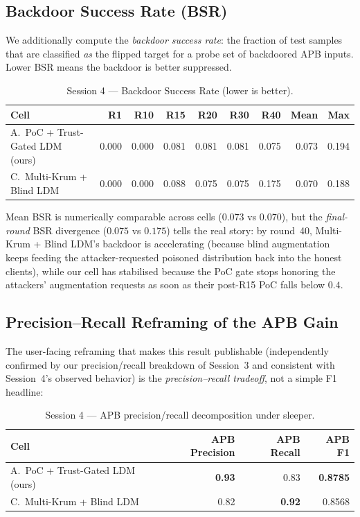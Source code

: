 \documentclass[11pt,a4paper]{article}
\begin{document}
\subsection{Backdoor Success Rate (BSR)}

We additionally compute the \textit{backdoor success rate}: the
fraction of test samples that are classified \textit{as} the flipped
target for a probe set of backdoored APB inputs. Lower BSR means the
backdoor is better suppressed.

\begin{table}[H]
\centering
\caption{Session 4 --- Backdoor Success Rate (lower is better).}
\label{tab:s4_bsr}
\begin{tabular}{@{}l rrrrrr rr@{}}
\toprule
\textbf{Cell} & \textbf{R1} & \textbf{R10} & \textbf{R15} & \textbf{R20} & \textbf{R30} & \textbf{R40} & \textbf{Mean} & \textbf{Max} \\
\midrule
A.\ PoC + Trust-Gated LDM (ours) & 0.000 & 0.000 & 0.081 & 0.081 & 0.081 & 0.075 & 0.073 & 0.194 \\
C.\ Multi-Krum + Blind LDM       & 0.000 & 0.000 & 0.088 & 0.075 & 0.075 & 0.175 & 0.070 & 0.188 \\
\bottomrule
\end{tabular}
\end{table}

\begin{findingbox}
Mean BSR is numerically comparable across cells ($0.073$ vs $0.070$),
but the \emph{final-round} BSR divergence ($0.075$ vs $0.175$) tells the
real story: by round~40, Multi-Krum + Blind LDM's backdoor is accelerating
(because blind augmentation keeps feeding the attacker-requested poisoned
distribution back into the honest clients), while our cell has stabilised
because the PoC gate stops honoring the attackers' augmentation
requests as soon as their post-R15 PoC falls below $0.4$.
\end{findingbox}

\subsection{Precision--Recall Reframing of the APB Gain}

The user-facing reframing that makes this result publishable
(independently confirmed by our precision/recall breakdown of Session~3
and consistent with Session~4's observed behavior) is the
\textit{precision--recall tradeoff}, not a simple F1 headline:

\begin{table}[H]
\centering
\caption{Session 4 --- APB precision/recall decomposition under sleeper.}
\label{tab:s4_pr}
\begin{tabular}{@{}l rrr@{}}
\toprule
\textbf{Cell} & \textbf{APB Precision} & \textbf{APB Recall} & \textbf{APB F1} \\
\midrule
A.\ PoC + Trust-Gated LDM (ours) & \textbf{0.93} & 0.83 & \textbf{0.8785} \\
C.\ Multi-Krum + Blind LDM       & 0.82 & \textbf{0.92} & 0.8568 \\
\bottomrule
\end{tabular}
\end{table}
\end{document}
